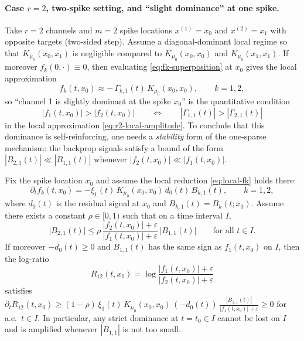 \paragraph{Case $r=2$, two-spike setting, and ``slight dominance'' at one spike.}
Take $r=2$ channels and $m=2$ spike locations $x^{(1)}=x_0$ and $x^{(2)}=x_1$ with opposite targets (two-sided step).
Assume a diagonal-dominant local regime so that $K_{\mu_0}(x_0,x_1)$ is negligible compared to $K_{\mu_0}(x_0,x_0)$ and $K_{\mu_0}(x_1,x_1)$.
If moreover $f_k(0,\cdot)\equiv 0$, then evaluating \eqref{eq:fk-superposition} at $x_0$ gives the local approximation
\begin{equation}\label{eq:r2-local-amplitude}
f_k(t,x_0)\approx -\,\Gamma_{k,1}(t)\,K_{\mu_0}(x_0,x_0),\qquad k=1,2,
\end{equation}
so ``channel 1 is slightly dominant at the spike $x_0$'' is the quantitative condition
\[
|f_1(t,x_0)|>|f_2(t,x_0)|\qquad\Longleftrightarrow\qquad |\Gamma_{1,1}(t)|>|\Gamma_{2,1}(t)|
\]
in the local approximation \eqref{eq:r2-local-amplitude}.
To conclude that this dominance is self-reinforcing, one needs a \emph{stability} form of the one-sparse mechanism:
the backprop signals satisfy a bound of the form $|B_{2,1}(t)|\ll |B_{1,1}(t)|$ whenever $|f_2(t,x_0)|\ll |f_1(t,x_0)|$.

\begin{lemma}[A local log-ratio growth criterion for $r=2$]\label{lem:r2-logratio-criterion}
\provedflag
Fix the spike location $x_0$ and assume the local reduction \eqref{eq:local-fk} holds there:
\[
\partial_t f_k(t,x_0)=-\xi_1(t)\,K_{\mu_0}(x_0,x_0)\,d_0(t)\,B_{k,1}(t),\qquad k=1,2,
\]
where $d_0(t)$ is the residual signal at $x_0$ and $B_{k,1}(t)=B_k(t;x_0)$.
Assume there exists a constant $\rho\in[0,1)$ such that on a time interval $I$,
\begin{equation}\label{eq:r2-stability-assumption}
\big|B_{2,1}(t)\big|\le \rho\,\frac{|f_2(t,x_0)|+\varepsilon}{|f_1(t,x_0)|+\varepsilon}\,\big|B_{1,1}(t)\big|
\qquad\text{for all }t\in I.
\end{equation}
If moreover $-d_0(t)\ge 0$ and $B_{1,1}(t)$ has the same sign as $f_1(t,x_0)$ on $I$, then the log-ratio
\[
R_{12}(t,x_0)=\log\frac{|f_1(t,x_0)|+\varepsilon}{|f_2(t,x_0)|+\varepsilon}
\]
satisfies $\partial_t R_{12}(t,x_0)\ge (1-\rho)\,\xi_1(t)\,K_{\mu_0}(x_0,x_0)\,(-d_0(t))\,\frac{|B_{1,1}(t)|}{|f_1(t,x_0)|+\varepsilon}\ge 0$ for a.e.\ $t\in I$.
In particular, any strict dominance at $t=t_0\in I$ cannot be lost on $I$ and is amplified whenever $|B_{1,1}|$ is not too small.
\end{lemma}

